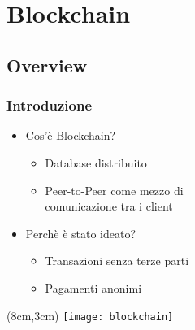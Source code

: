 \section{Blockchain}
\subsection{Overview}
\begin{frame}
  \frametitle{Introduzione}

  \begin{itemize}
   \item<1-> Cos'è Blockchain?
   \begin{itemize}
    \item Database distribuito
    \item Peer-to-Peer come mezzo di \\
    comunicazione tra i client
   \end{itemize}

   \item<2-> Perchè è stato ideato?
   \begin{itemize}
    \item Transazioni senza terze parti
    \item Pagamenti anonimi
   \end{itemize}

  \end{itemize}

 \begin{textblock*}{5cm}(8cm,3cm)
  \texttt{[image: blockchain]}
 \end{textblock*}

\end{frame}
